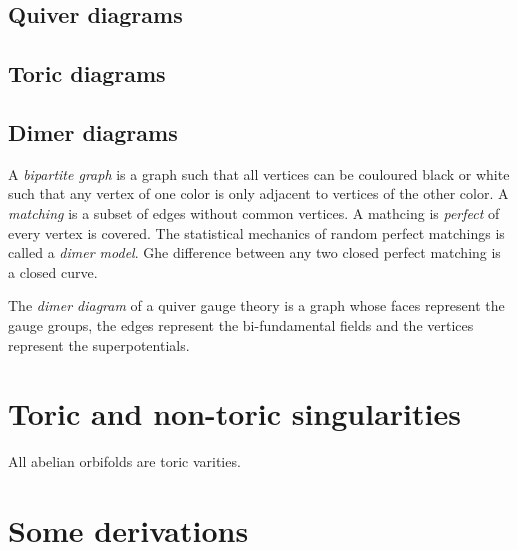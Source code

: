 \documentclass[a4paper,10pt]{article}
\begin{document}
    \subsection{Quiver diagrams}

    \subsection{Toric diagrams}

    \subsection{Dimer diagrams}

        A \emph{bipartite graph} is a graph such that all vertices can be couloured black or white such that any vertex of one color is only adjacent to vertices of the other color. A \emph{matching} is a subset of edges without common vertices. A mathcing is \emph{perfect} of every vertex is covered. The statistical mechanics of random perfect matchings is called a \emph{dimer model}. Ghe difference between any two closed perfect matching is a closed curve.

        The \emph{dimer diagram} of a quiver gauge theory is a graph whose faces represent the gauge groups, the edges represent the bi-fundamental fields and the vertices represent the superpotentials.

\section{Toric and non-toric singularities}

    All abelian orbifolds are toric varities.

\section{Some derivations}

    \subsection{}\label{app:compsum}
\end{document}
